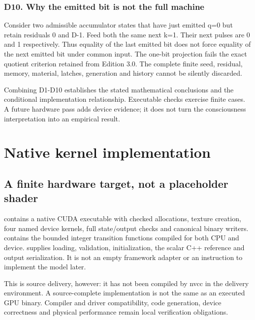 \documentclass[11pt,a4paper]{article}
\begin{document}
\subsubsection{D10. Why the emitted bit is not the full machine}\label{d10.-why-the-emitted-bit-is-not-the-full-machine}

Consider two admissible accumulator states that have just emitted q=0 but retain residuals 0 and D-1. Feed both the same next k=1. Their next pulses are 0 and 1 respectively. Thus equality of the last emitted bit does not force equality of the next emitted bit under common input. The one-bit projection fails the exact quotient criterion retained from Edition 3.0. The complete finite seed, residual, memory, material, latches, generation and history cannot be silently discarded.

Combining D1-D10 establishes the stated mathematical conclusions and the conditional implementation relationship. Executable checks exercise finite cases. A future hardware pass adds device evidence; it does not turn the consciousness interpretation into an empirical result.

\clearpage

\section{Native kernel implementation}\label{native-kernel-implementation}

\subsection{A finite hardware target, not a placeholder shader}\label{a-finite-hardware-target-not-a-placeholder-shader}

 contains a native CUDA executable with checked allocations, texture creation, four named device kernels, full state/output checks and canonical binary writers.  contains the bounded integer transition functions compiled for both CPU and device.  supplies loading, validation, initialization, the scalar C++ reference and output serialization. It is not an empty framework adapter or an instruction to implement the model later.

This is source delivery, however: it has not been compiled by nvcc in the delivery environment. A source-complete implementation is not the same as an executed GPU binary. Compiler and driver compatibility, code generation, device correctness and physical performance remain local verification obligations.
\end{document}
